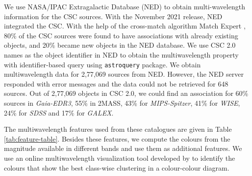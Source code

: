\documentclass[fleqn,usenatbib]{mnras}
\begin{document}
We use NASA/IPAC Extragalactic Database (NED) to obtain multi-wavelength information for the CSC sources. With the November 2021 release, NED integrated the CSC. With the help of the cross-match algorithm Match Expert \citep[MatchEx; ][]{2015ASPC..495...25O}, 80\% of the CSC sources were found to have associations with already existing objects, and 20\% became new objects in the NED database. We use CSC 2.0 names as the object identifier in NED to obtain the multiwavelength property with identifier-based query using \texttt{astroquery} package. We obtain multiwavelength data for 2,77,069 sources from NED. However, the NED server responded with error messages and the data could not be retrieved for 648 sources. Out of 2,77,069 objects in CSC 2.0, we could find an association for 60\% sources in {\em Gaia-EDR3}, 55\% in 2MASS, 43\% for \textit{MIPS-Spitzer}, 41\% for {\em WISE}, 24\% for {\em SDSS} and 17\% for {\em GALEX}.

The multiwavelength features used from these catalogues are given in Table \ref{tab:feature-table}. Besides these features, we compute the colours from the magnitude available in different bands and use them as additional features. We use an online multiwavelength visualization tool developed by \cite{2021RNAAS...5..102Y} to identify the colours that show the best class-wise clustering in a colour-colour diagram.
\end{document}
